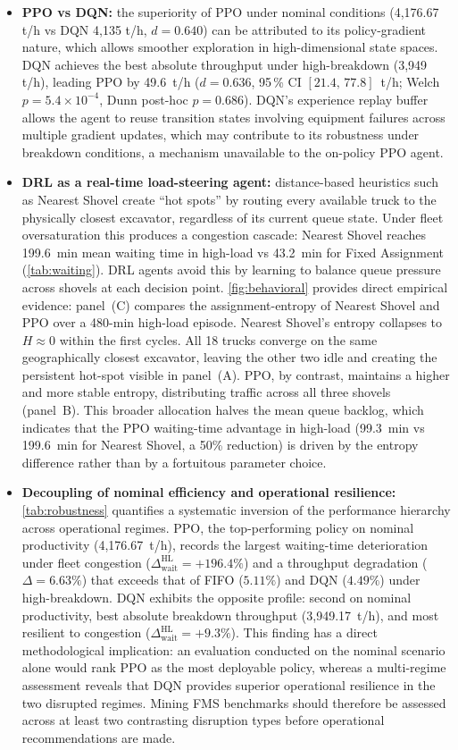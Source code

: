 \documentclass[11pt,a4paper]{article}
\begin{document}
\begin{itemize}
  \item \textbf{PPO vs DQN:} the superiority of PPO under nominal conditions (4,176.67 t/h vs DQN 4,135 t/h, $d=0.640$) can be attributed to its policy-gradient nature, which allows smoother exploration in high-dimensional state spaces. DQN achieves the best absolute throughput under high-breakdown (3,949 t/h), leading PPO by 49.6~t/h ($d=0.636$, 95\,\% CI $[21.4,\,77.8]$~t/h; Welch $p=5.4\times10^{-4}$, Dunn post-hoc $p=0.686$). DQN's experience replay buffer allows the agent to reuse transition states involving equipment failures across multiple gradient updates, which may contribute to its robustness under breakdown conditions, a mechanism unavailable to the on-policy PPO agent.
  \item \textbf{DRL as a real-time load-steering agent:} distance-based heuristics such as Nearest Shovel create ``hot spots'' by routing every available truck to the physically closest excavator, regardless of its current queue state. Under fleet oversaturation this produces a congestion cascade: Nearest Shovel reaches 199.6~min mean waiting time in high-load vs 43.2~min for Fixed Assignment (\cref{tab:waiting}). DRL agents avoid this by learning to balance queue pressure across shovels at each decision point. \cref{fig:behavioral} provides direct empirical evidence: panel~(C) compares the assignment-entropy of Nearest Shovel and PPO over a 480-min high-load episode. Nearest Shovel's entropy collapses to $H\approx 0$ within the first cycles. All 18 trucks converge on the same geographically closest excavator, leaving the other two idle and creating the persistent hot-spot visible in panel~(A). PPO, by contrast, maintains a higher and more stable entropy, distributing traffic across all three shovels (panel~B). This broader allocation halves the mean queue backlog, which indicates that the PPO waiting-time advantage in high-load (99.3~min vs 199.6~min for Nearest Shovel, a 50\% reduction) is driven by the entropy difference rather than by a fortuitous parameter choice.
  \item \textbf{Decoupling of nominal efficiency and operational resilience:} \cref{tab:robustness} quantifies a systematic inversion of the performance hierarchy across operational regimes. PPO, the top-performing policy on nominal productivity (4,176.67~t/h), records the largest waiting-time deterioration under fleet congestion ($\Delta_{\mathrm{wait}}^{\mathrm{HL}}=+196.4\%$) and a throughput degradation ($\Delta=6.63\%$) that exceeds that of FIFO ($5.11\%$) and DQN ($4.49\%$) under high-breakdown. DQN exhibits the opposite profile: second on nominal productivity, best absolute breakdown throughput (3,949.17~t/h), and most resilient to congestion ($\Delta_{\mathrm{wait}}^{\mathrm{HL}}=+9.3\%$). This finding has a direct methodological implication: an evaluation conducted on the nominal scenario alone would rank PPO as the most deployable policy, whereas a multi-regime assessment reveals that DQN provides superior operational resilience in the two disrupted regimes. Mining FMS benchmarks should therefore be assessed across at least two contrasting disruption types before operational recommendations are made.

\end{itemize}
\end{document}
